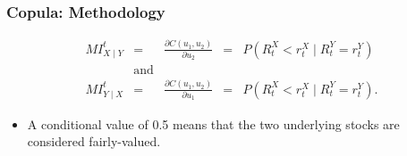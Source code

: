 \documentclass[pdf,9pt,xcolor=dvipsnames,hide notes]{beamer}
\begin{document}
\begin{frame}[label=frame4f]
	\frametitle{Copula: Methodology}
	
%	
	
				
		\begin{equation}
		\begin{aligned}
		MI_{X\mid Y}^{t}& = &\frac{\partial C(u_{1},u_{2})}{\partial u_{2}} & = & P(R_{t}^{X}<r_{t}^{X}\mid R_{t}^{Y}=r_{t}^{Y}) \\
		& \text{and} & \\
		MI_{Y\mid X}^{t}& = &\frac{\partial C(u_{1},u_{2})}{\partial u_{1}}& = & P(R_{t}^{X}<r_{t}^{X}\mid R_{t}^{Y}=r_{t}^{Y}).
		\end{aligned}
		\label{eq:eq31}
		\end{equation}
		
		\vspace{0.3cm}
		
			\begin{itemize}
			\justifying
			\item A conditional value of 0.5 means that
			the two underlying stocks are considered fairly-valued.
			\end{itemize}
\end{frame}
\end{document}
